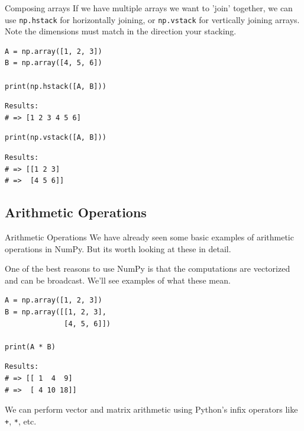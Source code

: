 \documentclass[10pt]{beamer}
\begin{document}
\begin{frame}[label={sec:org1de8367},fragile]{Composing arrays}
 If we have multiple arrays we want to 'join' together, we can use \texttt{np.hstack} for
horizontally joining, or \texttt{np.vstack} for vertically joining arrays. \alert{Note} the dimensions
must match in the direction your stacking.

\begin{verbatim}
A = np.array([1, 2, 3])
B = np.array([4, 5, 6])

print(np.hstack([A, B]))
\end{verbatim}

\begin{verbatim}
Results: 
# => [1 2 3 4 5 6]
\end{verbatim}


\begin{verbatim}
print(np.vstack([A, B]))
\end{verbatim}

\begin{verbatim}
Results: 
# => [[1 2 3]
# =>  [4 5 6]]
\end{verbatim}
\end{frame}

\subsection{Arithmetic Operations}
\label{sec:orgcedd46f}

\begin{frame}[label={sec:org692228f},fragile]{Arithmetic Operations}
 We have already seen some basic examples of arithmetic operations in NumPy. But its
worth looking at these in detail.

One of the best reasons to use NumPy is that the computations are \alert{vectorized} and can
be \alert{broadcast}. We'll see examples of what these mean.

\begin{verbatim}
A = np.array([1, 2, 3])
B = np.array([[1, 2, 3],
              [4, 5, 6]])

print(A * B)
\end{verbatim}

\begin{verbatim}
Results: 
# => [[ 1  4  9]
# =>  [ 4 10 18]]
\end{verbatim}


We can perform vector and matrix arithmetic using Python's infix operators like \texttt{+}, \texttt{*},
etc.
\end{frame}
\end{document}
